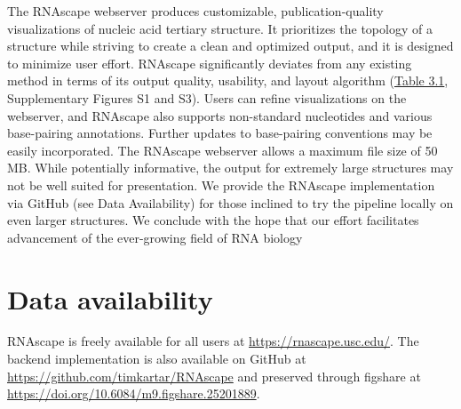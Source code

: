 The RNAscape webserver produces customizable, publication-quality visualizations of nucleic acid tertiary structure. It prioritizes the topology of a structure while striving to create a clean and optimized output, and it is designed to minimize user effort. RNAscape significantly deviates from any existing method in terms of its output quality, usability, and layout algorithm (\hyperref[table:rnascape]{Table 3.1}, Supplementary Figures S1 and S3). Users can refine visualizations on the webserver, and RNAscape also supports non-standard nucleotides and various base-pairing annotations. Further updates to base-pairing conventions may be easily incorporated. The RNAscape webserver allows a maximum file size of 50 MB. While potentially informative, the output for extremely large structures may not be well suited for presentation. We provide the RNAscape implementation via GitHub (see Data Availability) for those inclined to try the pipeline locally on even larger structures. We conclude with the hope that our effort facilitates advancement of the ever-growing field of RNA biology

\section{Data availability}

RNAscape is freely available for all users at \url{https://rnascape.usc.edu/}. The backend implementation is also available on GitHub at \url{https://github.com/timkartar/RNAscape} and preserved through figshare at \url{https://doi.org/10.6084/m9.figshare.25201889}.